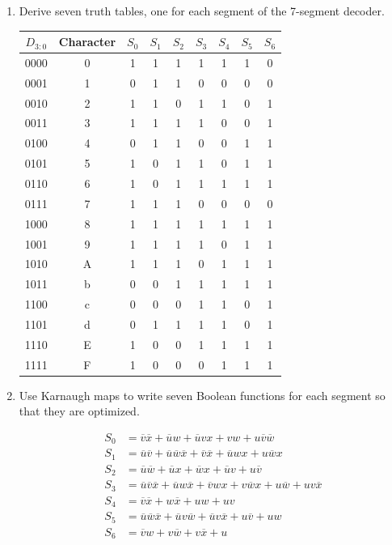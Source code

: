 \documentclass{article}
\begin{document}
\begin{enumerate}
\item Derive seven truth tables, one for each segment of the 7-segment decoder.

\begin{table}[ht!]
\small
\centering
\begin{tabular}{c|c|ccccccc}
$D_{3:0}$& Character & $S_0$ & $S_1$ & $S_2$ & $S_3$ & $S_4$ & $S_5$ & $S_6$\\
\hline
0000 & 0 & 1 & 1 & 1 & 1 & 1 & 1 & 0\\
0001 & 1 & 0 & 1 & 1 & 0 & 0 & 0 & 0\\
0010 & 2 & 1 & 1 & 0 & 1 & 1 & 0 & 1\\
0011 & 3 & 1 & 1 & 1 & 1 & 0 & 0 & 1\\
0100 & 4 & 0 & 1 & 1 & 0 & 0 & 1 & 1\\
0101 & 5 & 1 & 0 & 1 & 1 & 0 & 1 & 1\\
0110 & 6 & 1 & 0 & 1 & 1 & 1 & 1 & 1\\
0111 & 7 & 1 & 1 & 1 & 0 & 0 & 0 & 0\\
1000 & 8 & 1 & 1 & 1 & 1 & 1 & 1 & 1\\
1001 & 9 & 1 & 1 & 1 & 1 & 0 & 1 & 1\\
1010 & A & 1 & 1 & 1 & 0 & 1 & 1 & 1\\
1011 & b & 0 & 0 & 1 & 1 & 1 & 1 & 1\\
1100 & c & 0 & 0 & 0 & 1 & 1 & 0 & 1\\
1101 & d & 0 & 1 & 1 & 1 & 1 & 0 & 1\\
1110 & E & 1 & 0 & 0 & 1 & 1 & 1 & 1\\
1111 & F & 1 & 0 & 0 & 0 & 1 & 1 & 1\\
\end{tabular}
\end{table}

\item Use Karnaugh maps to write seven Boolean functions for each segment so that they are optimized.

\begin{align*}
    S_0 &= \overline{v}   \overline{x} + \overline{u}   w+ \overline{u}  v x+v w+u \overline{v}   \overline{w} \\
    S_1 &= \overline{u}  \overline{v} + \overline{u}   \overline{w}  \overline{x} + \overline{v}    \overline{x} + \overline{u}  w  x+u  \overline{w} x\\
    S_2 &= \overline{u}  \overline{w} + \overline{u}  x+ \overline{w} x+ \overline{u}   v+u  \overline{v} \\
    S_3 &=  \overline{u}  \overline{v}  \overline{x} + \overline{u} w   \overline{x} + \overline{v}  w  x+v \overline{w}   x+u  \overline{w} +uv  \overline{x} \\
    S_4 &=   \overline{v} \overline{x} +w \overline{x} +u  w+u v\\
    S_5 &=  \overline{u}  \overline{w}  \overline{x} + \overline{u}   v \overline{w} + \overline{u}   v  \overline{x} +u  \overline{v} +u w \\
    S_6 &=  \overline{v}  w+v  \overline{w} +v  \overline{x} +u \\
\end{align*}


\end{enumerate}
\end{document}
